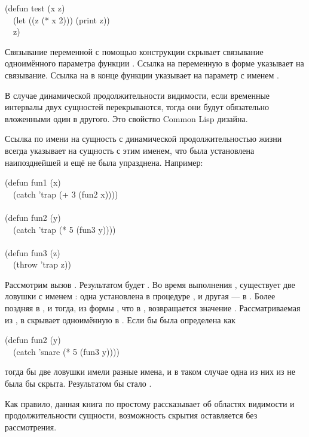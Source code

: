 \begin{lisp}
(defun test (x z) \\
~~(let ((z (* x 2))) (print z)) \\
~~z)
\end{lisp}

Связывание переменной  с помощью конструкции  скрывает связывание
одноимённого параметра функции . Ссылка на переменную  в форме
 указывает на  связывание. Ссылка на  в конце функции
указывает на параметр с именем .

В случае динамической продолжительности видимости, если временные интервалы двух
сущностей перекрываются, тогда они будут обязательно вложенными один в другого. Это
свойство Common Lisp дизайна.

Ссылка по имени на сущность с динамической продолжительностью жизни всегда
указывает на сущность с этим именем, что была установлена наипозднейшей и ещё не
была упразднена.
Например:
\begin{lisp}
(defun fun1 (x) \\
~~(catch 'trap (+ 3 (fun2 x)))) \\
 \\
(defun fun2 (y) \\
~~(catch 'trap (* 5 (fun3 y)))) \\
 \\
(defun fun3 (z) \\
~~(throw 'trap z))
\end{lisp}

Рассмотрим вызов . Результатом будет . Во время выполнения
, существует две ловушки с именем : одна установлена в
процедуре , и другая --- в . Более поздняя в , и
тогда, из формы , что в , возвращается значение .
Рассматриваемая из ,  в  скрывает одноимённую в
.
Если бы  была определена как
\begin{lisp}
(defun fun2 (y) \\
~~(catch 'snare (* 5 (fun3 y))))
\end{lisp}

тогда бы две ловушки имели разные имена, и в таком случае одна из них из
 не была бы скрыта. Результатом бы стало .

Как правило, данная книга по простому рассказывает об областях видимости и
продолжительности сущности, возможность скрытия оставляется без рассмотрения.

